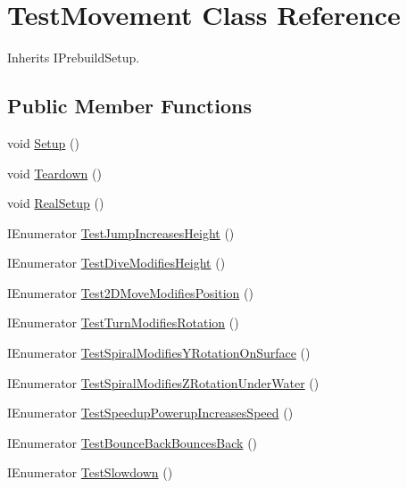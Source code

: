\hypertarget{class_test_movement}{}\section{Test\+Movement Class Reference}
\label{class_test_movement}


Inherits I\+Prebuild\+Setup.

\subsection*{Public Member Functions}
\begin{DoxyCompactItemize}
\item 
void \hyperlink{class_test_movement_ac3b7b7f9394bdfebb7dd09ee94de48cb}{Setup} ()
\item 
void \hyperlink{class_test_movement_aabeb3beb5a4c82191e651aaafd25961b}{Teardown} ()
\item 
void \hyperlink{class_test_movement_a62ef8c8115a8bbce2274cbda3f92eb5e}{Real\+Setup} ()
\item 
I\+Enumerator \hyperlink{class_test_movement_a235b8457a9c92a20b0af8832e8e2e8cf}{Test\+Jump\+Increases\+Height} ()
\item 
I\+Enumerator \hyperlink{class_test_movement_ab57160ba5b445dda6736525803be376d}{Test\+Dive\+Modifies\+Height} ()
\item 
I\+Enumerator \hyperlink{class_test_movement_ae5b9bf5e6413a93f4d1a0d3b979dd7d1}{Test2\+D\+Move\+Modifies\+Position} ()
\item 
I\+Enumerator \hyperlink{class_test_movement_a9eb3b16a356adc915132870fbbddde54}{Test\+Turn\+Modifies\+Rotation} ()
\item 
I\+Enumerator \hyperlink{class_test_movement_ad490417a5ff71ec4c013a0dc34da901f}{Test\+Spiral\+Modifies\+Y\+Rotation\+On\+Surface} ()
\item 
I\+Enumerator \hyperlink{class_test_movement_ad0a89a32757696be0407fe3fe128fbf6}{Test\+Spiral\+Modifies\+Z\+Rotation\+Under\+Water} ()
\item 
I\+Enumerator \hyperlink{class_test_movement_a7a866849fbeb51e7c3d500b1fc3d5a09}{Test\+Speedup\+Powerup\+Increases\+Speed} ()
\item 
I\+Enumerator \hyperlink{class_test_movement_a1de5217b6d56fba40c12f7edbbb3d071}{Test\+Bounce\+Back\+Bounces\+Back} ()
\item 
I\+Enumerator \hyperlink{class_test_movement_af1ce0ac38691919ebda49bfa1b6713c9}{Test\+Slowdown} ()
\end{DoxyCompactItemize}


